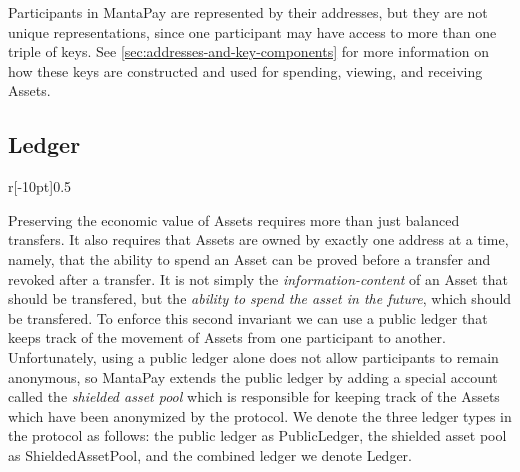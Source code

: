 \documentclass[a4paper]{article}
\theoremstyle{definition}
\newcommand{\Asset}{{\textsf{Asset}}}
\newcommand{\Ledger}{{\textsf{Ledger}}}
\newcommand{\MantaPay}{{\textsf{MantaPay}}}
\newcommand{\PublicLedger}{{\textsf{PublicLedger}}}
\newcommand{\ShieldedAssetPool}{{\textsf{ShieldedAssetPool}}}
\newcommand{\Transfer}{{\textsf{Transfer}}}
\newcommand{\UTXOSet}{{\textsf{UTXOSet}}}
\newcommand{\VoidNumberSet}{{\textsf{VoidNumberSet}}}
\newcommand{\allocate}{{\textsf{allocate}}}
\newcommand{\mint}{{\textsf{mint}}}
\newcommand{\reclaim}{{\textsf{reclaim}}}
\newcommand{\spend}{{\textsf{spend}}}
\begin{document}
Participants in \MantaPay{} are represented by their addresses, but they are not unique representations, since one participant may have access to more than one triple of keys. See \autoref{sec:addresses-and-key-components} for more information on how these keys are constructed and used for spending, viewing, and receiving \Asset{s}.

\subsection{Ledger}

\begingroup
\setlength{\columnsep}{20pt}

\begin{wrapfigure}{r}[-10pt]{0.5\textwidth}
    \begin{center}
    \end{center}
    \caption{Lifecycle of an \Asset{}.}
\end{wrapfigure}

Preserving the economic value of \Asset{s} requires more than just balanced transfers. It also requires that \Asset{s} are owned by exactly one address at a time, namely, that the ability to spend an \Asset{} can be proved before a transfer and revoked after a transfer. It is not simply the \emph{information-content} of an \Asset{} that should be transfered, but the \emph{ability to spend the asset in the future}, which should be transfered. To enforce this second invariant we can use a public ledger\footnotemark{} that keeps track of the movement of \Asset{s} from one participant to another. Unfortunately, using a public ledger alone does not allow participants to remain anonymous, so \MantaPay{} extends the public ledger by adding a special account called the \emph{shielded asset pool} which is responsible for keeping track of the \Asset{s} which have been anonymized by the protocol. We denote the three ledger types in the protocol as follows: the public ledger as \PublicLedger{}, the shielded asset pool as \ShieldedAssetPool{}, and the combined ledger we denote \Ledger{}.
\end{document}
